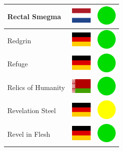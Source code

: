 \documentclass[12pt, a4paper, twoside]{report}
\begin{document}
\begin{center}
\begin{longtable}{|p{5cm}|p{2cm}|p{2cm}|}
Rectal Smegma & \includegraphics[width=1cm]{4x3/nl} & \includegraphics[width=1cm]{likes/y} \\ \hline
Redgrin & \includegraphics[width=1cm]{4x3/de} & \includegraphics[width=1cm]{likes/y} \\ \hline
Refuge & \includegraphics[width=1cm]{4x3/de} & \includegraphics[width=1cm]{likes/y} \\ \hline
Relics of Humanity & \includegraphics[width=1cm]{4x3/by} & \includegraphics[width=1cm]{likes/y} \\ \hline
Revelation Steel & \includegraphics[width=1cm]{4x3/de} & \includegraphics[width=1cm]{likes/m} \\ \hline
Revel in Flesh & \includegraphics[width=1cm]{4x3/de} & \includegraphics[width=1cm]{likes/y} \\ \hline

\end{longtable}
\end{center}
\end{document}
